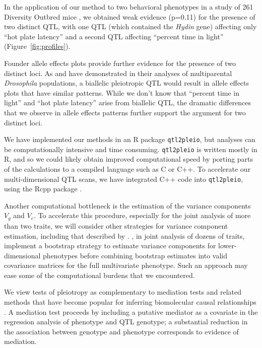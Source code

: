 \documentclass[12pt,twoside, lineno]{gsajnl}
\begin{document}
In the application of our method to two behavioral phenotypes in a
study of 261 Diversity Outbred mice
\citep{recla2014precise,logan2013high}, we obtained weak evidence
(p=0.11) for the presence of two distinct QTL, with one QTL (which
contained the \textit{Hydin} gene) affecting only ``hot plate latency'' and a
second QTL affecting ``percent time in light'' (Figure~\ref{fig:profiles}).

Founder allele effects plots provide further evidence for the presence
of two distinct loci. As \citet{macdonald2007joint} and
\citet{king2012genetic} have demonstrated in their analyses of multiparental
\emph{Drosophila} populations, a biallelic pleiotropic QTL would result in
allele effects plots that have similar patterns. While we don't know
that ``percent time in light'' and ``hot plate latency'' arise from
biallelic QTL, the dramatic differences that we observe in allele
effects patterns further support the argument for two distinct loci.

We have implemented our methods in an R package
\texttt{qtl2pleio}, but analyses can be computationally intensive and
time consuming. \texttt{qtl2pleio} is written mostly in R, and so we
could likely obtain improved computational speed by porting parts of
the calculations to a compiled language such as C or C++.
To accelerate our multi-dimensional QTL
scans, we have integrated C++ code into \texttt{qtl2pleio},
using the Rcpp package \citep{eddelbuettel2011rcpp}.

Another computational bottleneck is the estimation of the variance
components $V_g$ and $V_e$. To accelerate this procedure, 
especially for the joint analysis of more than two traits, we will
consider other strategies for variance component estimation, including
that described by \citet{hannah2018limmbo}. \citet{hannah2018limmbo}, in joint analysis of dozens of traits, implement a bootstrap
strategy to estimate variance components for lower-dimensional
phenotypes before combining bootstrap estimates
into valid covariance matrices for the full multivariate phenotype. 
Such an approach may ease some of the computational burdens that we encountered.


We view tests of pleiotropy as complementary to 
mediation tests and related methods that have become popular for
inferring biomolecular causal relationships
\citep{chick2016defining,schadt2005integrative,baron1986moderator}. A
mediation test proceeds by including a putative mediator as a
covariate in the regression analysis of phenotype and QTL genotype;
a substantial reduction in the association between
genotype and phenotype corresponds to evidence of mediation. 
\end{document}
